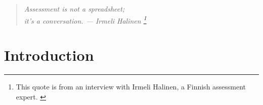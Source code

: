 \documentclass[fleqn,10pt]{SelfArx}\usepackage[]{graphicx}\usepackage[]{color}
\affiliation{\textsuperscript{1}\textit{General Education Coordinator, Ferris State University}} %
\begin{document}
\flushbottom %

\maketitle %

\tableofcontents %

{
	\fancyhf{}
}
\thispagestyle{firststyle}










\begin{quote}
\begin{center}
\textit{Assessment is not a spreadsheet; \\ it's a conversation. --- Irmeli Halinen \footnote{This quote is from an interview with Irmeli Halinen, a Finnish assessment expert. \citep{Bower}}}
\end{center}
\end{quote}

\section{Introduction} %
\end{document}
